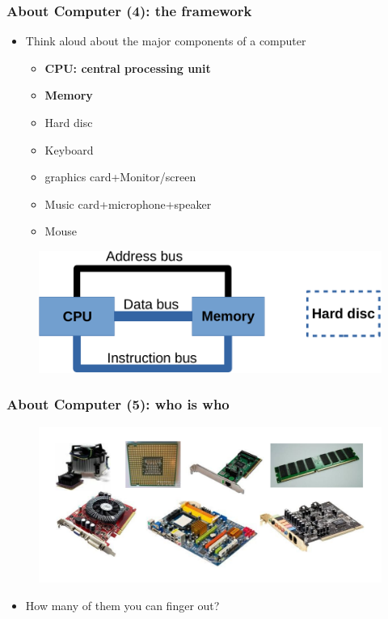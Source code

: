 \begin{frame}
\frametitle{About Computer (4): the framework}
\begin{itemize}
	\item {Think aloud about the major components of a computer}
	\begin{itemize}
		\item {\textbf{CPU: central processing unit}}
		\item {\textbf{Memory}}
		\item {Hard disc}
		\item {Keyboard}
		\item {graphics card+Monitor/screen}
		\item {Music card+microphone+speaker}
		\item {Mouse}
	\end{itemize}
\end{itemize}
\begin{figure}
	\includegraphics[width=0.7\linewidth]{figs/framework.pdf}
\end{figure}
\end{frame}

\begin{frame}
\frametitle{About Computer (5): who is who}
\begin{figure}
	\includegraphics[width=0.85\linewidth]{figs/hardwares.pdf}
\end{figure}
\begin{itemize}
	\item {How many of them you can finger out?}
\end{itemize}
\end{frame}

